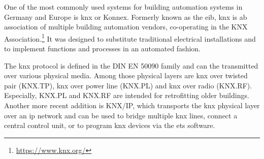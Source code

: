 One of the most commonly used systems for building automation systems in Germany and Europe is \Gls{knx} or Konnex. Formerly known as the \gls{eib}, \gls{knx} is ab association of multiple building automation vendors, co-operating in the KNX Association.\footnote{\url{https://www.knx.org/}}
It was designed to substitute traditional electrical installations and to implement functions and processes in an automated fashion. \parencite{Merz2009}

The \gls{knx} protocol is defined in the DIN EN 50090 family and can the transmitted over various physical media. Among those physical layers are \gls{knx} over twisted pair (KNX.TP), \gls{knx} over power line (KNX.PL) and \gls{knx} over radio (KNX.RF). Especially, KNX.PL and KNX.RF are intended for retrofitting older buildings.
Another more recent addition is KNX/IP, which transports the \gls{knx} physical layer over an \gls{ip} network and can be used to bridge multiple \gls{knx} lines, connect a central control unit, or to program \gls{knx} devices via the \gls{ets} software.
\parencite{Merz2009}

